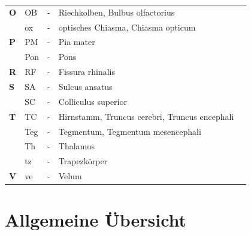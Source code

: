 \documentclass[12pt,a4paper,pdftex]{article}
\begin{document}
\begin{table}[H]
\begin{tabular}{llcll}
\textbf{O} & OB  & -          & Riechkolben, Bulbus olfactorius                                                      &                               \\
\textbf{}  & ox  & -          & optisches Chiasma, Chiasma opticum           &                               \\
\textbf{P} & PM  & -          & Pia mater                                                               &                               \\
\textbf{}  & Pon & -          & Pons                                                                    &                               \\
\textbf{R} & RF  & -          & Fissura rhinalis                                                        &                               \\
\textbf{S} & SA  & -          & Sulcus ansatus                                                          &                               \\
\textbf{}  & SC  & -          & Colliculus superior                                                     &                               \\
\textbf{T} & TC  & -          & Hirnstamm, Truncus cerebri, Truncus encephali &                               \\
\textbf{}  & Teg & -          & Tegmentum, Tegmentum mesencephali           &                               \\
\textbf{}  & Th  & -          & Thalamus                                                                &                               \\
\textbf{}  & tz  & -          & Trapezkörper                                                            &                               \\
\textbf{V} & ve  & -          & Velum                                                                   &                              
\end{tabular}
\end{table}

\newpage
\section{Allgemeine Übersicht}
\end{document}
